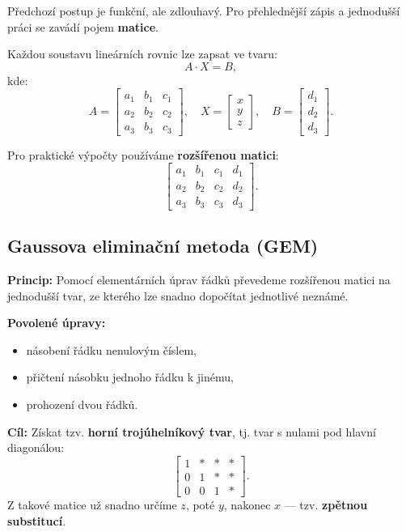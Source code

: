 \documentclass[12pt,a4paper]{article}
\begin{document}
Předchozí postup je funkční, ale zdlouhavý.  
Pro přehlednější zápis a jednodušší práci se zavádí pojem \textbf{matice}.

Každou soustavu lineárních rovnic lze zapsat ve tvaru:
\[
A \cdot X = B,
\]
kde:
\[
A =
\begin{bmatrix}
a_1 & b_1 & c_1\\
a_2 & b_2 & c_2\\
a_3 & b_3 & c_3
\end{bmatrix},
\quad
X =
\begin{bmatrix}
x\\y\\z
\end{bmatrix},
\quad
B =
\begin{bmatrix}
d_1\\d_2\\d_3
\end{bmatrix}.
\]

\noindent
Pro praktické výpočty používáme \textbf{rozšířenou matici}:
\[
\left[
\begin{array}{ccc|c}
a_1 & b_1 & c_1 & d_1\\
a_2 & b_2 & c_2 & d_2\\
a_3 & b_3 & c_3 & d_3
\end{array}
\right].
\]


\subsection{Gaussova eliminační metoda (GEM)}

\textbf{Princip:}  
Pomocí elementárních úprav řádků převedeme rozšířenou matici na jednodušší tvar,  
ze kterého lze snadno dopočítat jednotlivé neznámé.

\begin{notebox}
\textbf{Povolené úpravy:}
\begin{itemize}
  \item násobení řádku nenulovým číslem,
  \item přičtení násobku jednoho řádku k jinému,
  \item prohození dvou řádků.
\end{itemize}
\end{notebox}

\textbf{Cíl:}  
Získat tzv. \textbf{horní trojúhelníkový tvar}, tj. tvar s nulami pod hlavní diagonálou:
\[
\begin{bmatrix}
1 & * & * & *\\
0 & 1 & * & *\\
0 & 0 & 1 & *
\end{bmatrix}.
\]
Z takové matice už snadno určíme \(z\), poté \(y\), nakonec \(x\) — tzv. \textbf{zpětnou substitucí}.
\end{document}
